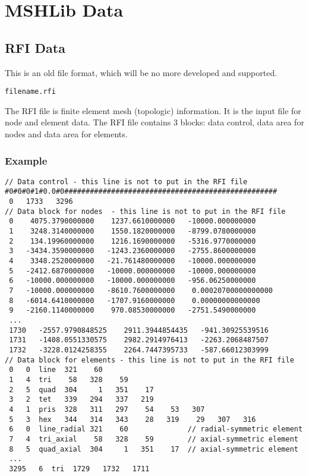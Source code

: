 \section{MSHLib Data}

\subsection{RFI Data}

This is an old file format, which will be no more developed and
supported.

\begin{verbatim}
filename.rfi
\end{verbatim}

The RFI file is finite element mesh (topologic) information.
It is the input file for node and element data. The RFI file
contains 3 blocks: data control, data area for nodes and data area
for elements.

\subsubsection{Example}

\small
\begin{verbatim}
// Data control - this line is not to put in the RFI file
#0#0#0#1#0.0#0##################################################
 0   1733   3296
// Data block for nodes  - this line is not to put in the RFI file
 0    4075.3790000000    1237.6610000000   -10000.000000000
 1    3248.3140000000    1550.1820000000   -8799.0780000000
 2    134.19960000000    1216.1690000000   -5316.9770000000
 3   -3434.3590000000   -1243.2360000000   -2755.8600000000
 4    3348.2520000000   -21.761480000000   -10000.000000000
 5   -2412.6870000000   -10000.000000000   -10000.000000000
 6   -10000.000000000   -10000.000000000   -956.06250000000
 7   -10000.000000000   -8610.7600000000    0.00020700000000000
 8   -6014.6410000000   -1707.9160000000    0.00000000000000
 9   -2160.1140000000    970.08530000000   -2751.5490000000
 ...
 1730   -2557.9790848525    2911.3944854435   -941.30925539516
 1731   -1408.0551330575    2982.2914976413   -2263.2068487507
 1732   -3228.0124258355    2264.7447395733   -587.66012303999
// Data block for elements - this line is not to put in the RFI file
 0   0  line  321    60
 1   4  tri    58   328    59
 2   5  quad  304     1   351    17
 3   2  tet   339   294   337   219
 4   1  pris  328   311   297    54    53   307
 5   3  hex   344   314   343    28   319    29   307   316
 6   0  line_radial 321    60              // radial-symmetric element
 7   4  tri_axial    58   328    59        // axial-symmetric element
 8   5  quad_axial  304     1   351    17  // axial-symmetric element
 ...
 3295   6  tri  1729   1732   1711
\end{verbatim}
\normalsize

